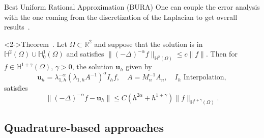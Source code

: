 \documentclass[aspectratio=169,xcolor=dvipsnames]{beamer}
\begin{document}
	\begin{frame}{Best Uniform Rational Approximation (BURA)}
	One can couple the error analysis with the one coming from the discretization of the  Laplacian to get overall results~\parencite{MR4065429}.
	
	\begin{alertblock}<2->{Theorem~\parencite[Theorem 4.2]{MR4065429}.}
	Let $\Omega \subset \mathbb{R}^2$ and suppose that the solution is in $\mathbb{H}^2(\Omega) \cup \mathbb{H}^1_0(\Omega)$ and satisfies $\| (-\Delta)^{-\alpha} f \|_{\mathbb{H}^2(\Omega)} \leq c \|f\|$. Then for $f \in \mathbb{H}^{1+\gamma}(\Omega)$, $\gamma > 0$, the solution $\mathbf{u}_h$ given by
	\[
	\mathbf{u}_h = \lambda_{1,h}^{-\alpha}(\lambda_{1,h} A^{-1})^\alpha I_h f, \quad  A = M_n^{-1} A_n, \quad I_h \text{ Interpolation},
	\]
	satisfies
	\[
	\| (-\Delta)^{-\alpha} f - \mathbf{u}_h \| \leq C (h^{2\alpha} + h^{1+\gamma}) \|f\|_{\mathbb{H}^{1+\gamma}(\Omega)}.
	\]
	\end{alertblock}

	
	\end{frame}

	\subsection{Quadrature-based approaches}
	
\end{document}
